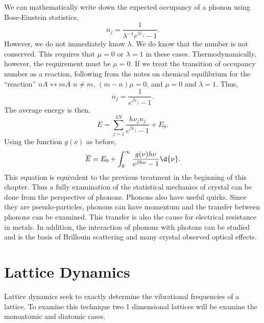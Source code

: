 We can mathematically write down the expected occupancy of a phonon using
Bose-Einstein statistics,
\begin{equation*}
	\overline{n}_j = \frac{1}{\lambda^{-1} e^{\beta \varepsilon_{j}} - 1}.
\end{equation*}
However, we do not immediately know $\lambda$. We do know that the number is not
conserved. This requires that $\mu=0$ or $\lambda=1$ in these cases.
Thermodynamically, however, the requirement must be $\mu = 0$. If we treat the
transition of occupancy number as a reaction, following
from the notes on chemical equilibrium for the ``reaction'' $nA \leftrightarrow
mA$ $n \ne m$, $(m-n)\mu = 0$, and $\mu=0$ and $\lambda = 1$. Thus,
\begin{equation*}
	\overline{n}_j = \frac{1}{e^{\beta \varepsilon_{j}} - 1}.
\end{equation*}
The average energy is then,
 \begin{equation*}
	 \overline{E} = \sum_{j=1}^{3N}{\frac{h\nu_j n_j}{e^{\beta \varepsilon_{j}}
	 - 1}} + E_0.
\end{equation*}
Using the function $g(\nu)$ as before,
\begin{equation*}
	\overline{E} = E_0 + \int_{0}^{\infty}{\frac{g(\nu)h\nu}{e^{\beta
	h\nu} - 1} \d{\nu}}.
\end{equation*}
This equation is equivalent to the previous treatment in the beginning of this
chapter. Thus a fully examination of the statistical mechanics of crystal can be
done from the perspective of phonons. Phonons also have useful quirks. Since
they are pseudo-particles, phonons can have momentum and the transfer between
phonons can be examined. This transfer is also the cause for electrical
resistance in metals. In addition, the interaction of phonons with photons
can be studied and is the basis of Brillouin scattering and many crystal
observed optical effects.

\section{Lattice Dynamics}%
\label{sec:crystals_ld}
Lattice dynamics seek to exactly determine the vibrational frequencies of a
lattice. To examine this technique two 1 dimensional lattices will be examine
the monoatomic and diatomic cases.

